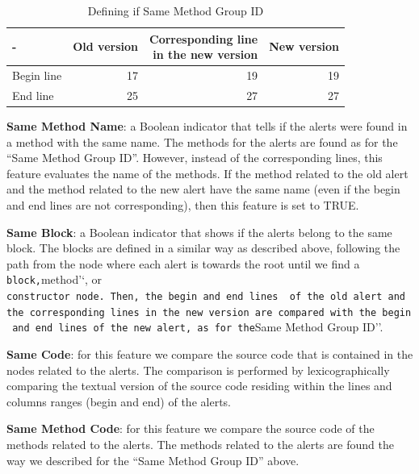 \documentclass[
]{article}
\begin{document}
\normalsize

\small

\begin{table}[H]

\caption{\label{tab:unnamed-chunk-11}Defining if Same Method Group ID \label{tab_same_method_2}}
\centering
\begin{tabular}[t]{l|r|r|r}
\hline
- & Old version & \makecell[l]{Corresponding line\\in the new version} & New version\\
\hline
Begin line & 17 & 19 & 19\\
\hline
End line & 25 & 27 & 27\\
\hline
\end{tabular}
\end{table}

\normalsize

\noindent \textbf{Same Method Name}: a Boolean indicator that tells if
the alerts were found in a method with the same name. The methods for
the alerts are found as for the ``Same Method Group ID''. However,
instead of the corresponding lines, this feature evaluates the name of
the methods. If the method related to the old alert and the method
related to the new alert have the same name (even if the begin and end
lines are not corresponding), then this feature is set to TRUE.

\noindent \textbf{Same Block}: a Boolean indicator that shows if the
alerts belong to the same block. The blocks are defined in a similar way
as described above, following the path from the node where each alert is
towards the root until we find a
\texttt{block\textquotesingle{}\textquotesingle{},}method'`, or
\texttt{constructor\textquotesingle{}\textquotesingle{}\ node.\ Then,\ the\ begin\ and\ end\ lines\ \ of\ the\ old\ alert\ and\ the\ corresponding\ lines\ in\ the\ new\ version\ are\ compared\ with\ the\ begin\ and\ end\ lines\ of\ the\ new\ alert,\ as\ for\ the}Same
Method Group ID''.

\noindent \textbf{Same Code}: for this feature we compare the source
code that is contained in the nodes related to the alerts. The
comparison is performed by lexicographically comparing the textual
version of the source code residing within the lines and columns ranges
(begin and end) of the alerts.

\noindent \textbf{Same Method Code}: for this feature we compare the
source code of the methods related to the alerts. The methods related to
the alerts are found the way we described for the ``Same Method Group
ID'' above.
\end{document}
